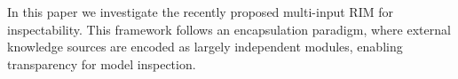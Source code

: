 In this paper we investigate the recently proposed multi-input RIM for inspectability. This framework follows an encapsulation paradigm, where external knowledge sources are encoded as largely independent modules, enabling transparency for model inspection.
